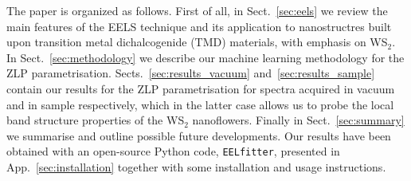 The paper is organized as follows.
%
First of all, in Sect.~\ref{sec:eels}
we review the main features of the EELS technique
and its application to nanostructres built upon transition metal
dichalcogenide (TMD) materials, with emphasis on WS$_2$.
%
In Sect.~\ref{sec:methodology} we describe our machine learning methodology
for the ZLP parametrisation.
%
Sects.~\ref{sec:results_vacuum} and~\ref{sec:results_sample} contain
our results for the ZLP parametrisation for spectra acquired
in vacuum and in sample respectively, which in the latter
case allows us to probe the local band structure properties
of the WS$_2$ nanoflowers.
%
Finally in Sect.~\ref{sec:summary} we summarise
and outline possible future developments.
%
Our results have been obtained with an open-source {\sc Python} code,
{\tt EELfitter}, presented in App.~\ref{sec:installation}
together with some installation and usage instructions.
